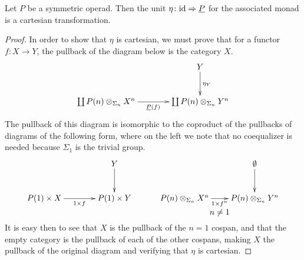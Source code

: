 \begin{prop}\label{prop:cart_unit}
Let $P$ be a symmetric operad. Then the unit $\eta \colon \textrm{id} \Rightarrow \underline{P}$ for the associated monad is a cartesian transformation.
\end{prop}
\begin{proof}
In order to show that $\eta$ is cartesian, we must prove that for a functor $f \colon X \rightarrow Y$, the pullback of the diagram below is the category $X$.
    \[
        \xy
            (40,0)*+{Y}="10";
            (0,-15)*+{\coprod \coeqsig{P}{X}{n}}="01";
            (40,-15)*+{\coprod \coeqsig{P}{Y}{n}}="11";
            {\ar^{\eta_Y} "10" ; "11"};
            {\ar_{\underline{P}(f)} "01" ; "11"};
        \endxy
    \]
The pullback of this diagram is isomorphic to the coproduct of the pullbacks of diagrams of the following form, where on the left we note that no coequalizer is needed because $\Sigma_1$ is the trivial group.
\[
        \xy
            (30,0)*+{Y}="10";
            (0,-15)*+{P(1) \times X}="01";
            (30,-15)*+{P(1) \times Y}="11";
            {\ar^{} "10" ; "11"};
            {\ar_{1 \times f} "01" ; "11"};
            (90,0)*+{\emptyset}="60";
            (60,-15)*+{\coeqsig{P}{X}{n}}="51";
            (90,-15)*+{\coeqsig{P}{Y}{n}}="61";
            {\ar^{} "60" ; "61"};
            {\ar_{1 \times f^n} "51" ; "61"};
            (75,-21)*{n \neq 1}
        \endxy
    \]
It is easy then to see that $X$ is the pullback of the $n=1$ cospan, and that the empty category is the pullback of each of the other cospans, making $X$ the pullback of the original diagram and verifying that $\eta$ is cartesian.
\end{proof}




